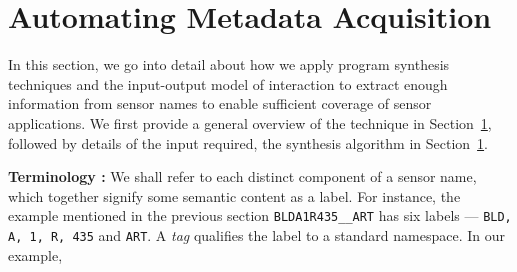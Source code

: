 \section{Automating Metadata Acquisition}
%
%

In this section, we go into detail about how we apply program synthesis techniques and the input-output model of interaction to extract enough information from sensor names to enable sufficient coverage of sensor applications. We first provide a  general overview of the technique in Section~\ref{}, followed by details of the input required, the synthesis algorithm in Section~\ref{}. 

%
{\bf Terminology :} We shall refer to each distinct component of a sensor name, which together signify some semantic content as a label. For instance, the example mentioned in the previous section \texttt{BLDA1R435\_\_ART} has six labels --- \texttt{BLD, A, 1, R, 435} and \texttt{ART}. A \emph{tag} qualifies the label to a standard namespace. In our example,  

